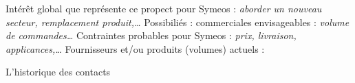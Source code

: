 \documentclass[a4paper, oneside, 12pt, french]{article}
\begin{document}
\begin{fminipage}
\vspace{12pt}
Intérêt global que représente ce propect pour Symeos : \textit{aborder un nouveau secteur, remplacement produit,\dots}
\newline
\newline
Possibiliés  : commerciales envisageables : \textit{volume de commandes\dots}
\newline
\newline
Contraintes probables pour Symeos : \textit{prix, livraison, applicances,\dots}
\newline
\newline
Fournisseurs et/ou produits (volumes) actuels :\\
\end{fminipage}

\newpage

{\Large L'historique des contacts}
\end{document}
